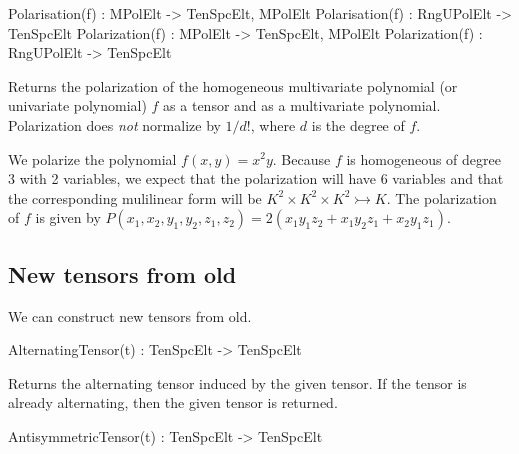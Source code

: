 \begin{intrinsics}
Polarisation(f) : MPolElt -> TenSpcElt, MPolElt
Polarisation(f) : RngUPolElt -> TenSpcElt
Polarization(f) : MPolElt -> TenSpcElt, MPolElt
Polarization(f) : RngUPolElt -> TenSpcElt
\end{intrinsics}

Returns the polarization of the homogeneous multivariate polynomial (or univariate polynomial) $f$ as a tensor and as a multivariate polynomial. 
Polarization does \emph{not} normalize by $1/d!$, where $d$ is the degree of $f$.  

\begin{example}[TensorPolarization]
We polarize the polynomial $f(x,y)=x^2y$. 
Because $f$ is homogeneous of degree 3 with 2 variables, we expect that the polarization will have 6 variables and that the corresponding mulilinear form will be $K^2\times K^2\times K^2\rightarrowtail K$.
The polarization of $f$ is given by $P(x_1,x_2,y_1,y_2,z_1,z_2 ) = 2 (x_1y_1z_2 + x_1y_2z_1 + x_2y_1z_1)$.

\end{example}




\subsection{New tensors from old}
We can construct new tensors from old.

\begin{intrinsics}
AlternatingTensor(t) : TenSpcElt -> TenSpcElt
\end{intrinsics}

Returns the alternating tensor induced by the given tensor. If 
the tensor is already alternating, then the given tensor is returned.

\begin{intrinsics}
AntisymmetricTensor(t) : TenSpcElt -> TenSpcElt
\end{intrinsics}

